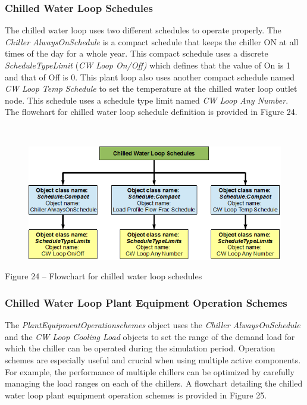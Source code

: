 \subsubsection{Chilled Water Loop Schedules}\label{chilled-water-loop-schedules}

The chilled water loop uses two different schedules to operate properly. The \emph{Chiller AlwaysOnSchedule} is a compact schedule that keeps the chiller ON at all times of the day for a whole year. This compact schedule uses a discrete \emph{ScheduleTypeLimit} (\emph{CW Loop On/Off)} which defines that the value of On is 1 and that of Off is 0. This plant loop also uses another compact schedule named \emph{CW Loop Temp Schedule} to set the temperature at the chilled water loop outlet node. This schedule uses a schedule type limit named \emph{CW Loop Any Number}. The flowchart for chilled water loop schedule definition is provided in Figure 24.

\emph{~}

\begin{figure}[htbp]
\centering
\includegraphics{media/image024.png}
\caption{}
\end{figure}

Figure 24 -- Flowchart for chilled water loop schedules

\subsubsection{Chilled Water Loop Plant Equipment Operation Schemes}\label{chilled-water-loop-plant-equipment-operation-schemes}

The \emph{PlantEquipmentOperationschemes} object uses the \emph{Chiller AlwaysOnSchedule} and the \emph{CW Loop Cooling Load} objects to set the range of the demand load for which the chiller can be operated during the simulation period. Operation schemes are especially useful and crucial when using multiple active components. For example, the performance of multiple chillers can be optimized by carefully managing the load ranges on each of the chillers. A flowchart detailing the chilled water loop plant equipment operation schemes is provided in Figure 25.

